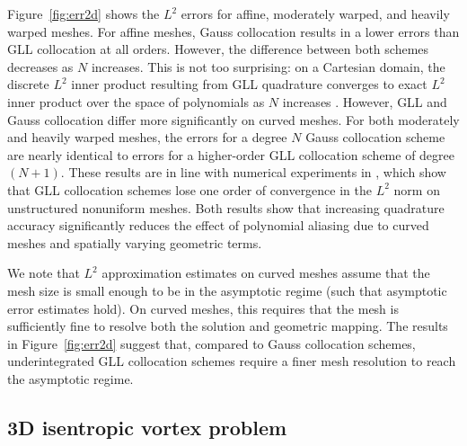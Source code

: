 \documentclass[review,onefignum,onetabnum,final]{siamart171218}
\begin{document}
Figure~\ref{fig:err2d} shows the $L^2$ errors for affine, moderately warped, and heavily warped meshes.  For affine meshes, Gauss collocation results in a lower errors than GLL collocation at all orders.  However, the difference between both schemes decreases as $N$ increases.  This is not too surprising: on a Cartesian domain, the discrete $L^2$ inner product resulting from GLL quadrature converges to exact $L^2$ inner product over the space of polynomials as $N$ increases \cite{quarteroni1994introduction}.  However, GLL and Gauss collocation differ more significantly on curved meshes.  For both moderately and heavily warped meshes, the errors for a degree $N$ Gauss collocation scheme are nearly identical to errors for a higher-order GLL collocation scheme of degree $(N+1)$.  These results are in line with numerical experiments in \cite{parsani2016entropy}, which show that GLL collocation schemes lose one order of convergence in the $L^2$ norm on unstructured nonuniform meshes.  Both results show that increasing quadrature accuracy significantly reduces the effect of polynomial aliasing due to curved meshes and spatially varying geometric terms.  

We note that $L^2$ approximation estimates on curved meshes \cite{lenoir1986optimal, warburton2013low} assume that the mesh size is small enough to be in the asymptotic regime (such that asymptotic error estimates hold).  On curved meshes, this requires that the mesh is sufficiently fine to resolve both the solution and geometric mapping.   The results in Figure~\ref{fig:err2d} suggest that, compared to Gauss collocation schemes, underintegrated GLL collocation schemes require a finer mesh resolution to reach the asymptotic regime.  

\subsection{3D isentropic vortex problem}
\end{document}

